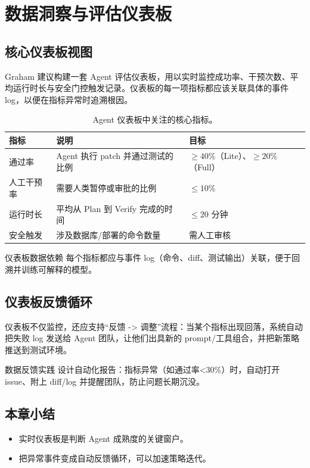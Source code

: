 \section{数据洞察与评估仪表板}
\subsection{核心仪表板视图}
Graham 建议构建一套 Agent 评估仪表板，用以实时监控成功率、干预次数、平均运行时长与安全门控触发记录。仪表板的每一项指标都应该关联具体的事件 log，以便在指标异常时追溯根因。

\begin{table}[H]
\centering
\begin{tabular}{p{} p{} p{}}
\toprule
指标 & 说明 & 目标 \\
\midrule
通过率 & Agent 执行 patch 并通过测试的比例 & \(\geq 40\%\)（Lite）、\(\geq 20\%\)（Full） \\
\midrule
人工干预率 & 需要人类暂停或审批的比例 & \(\leq 10\%\) \\
\midrule
运行时长 & 平均从 Plan 到 Verify 完成的时间 & \(\leq 20 \text{ 分钟}\) \\
\midrule
安全触发 & 涉及数据库/部署的命令数量 & 需人工审核 \\
\bottomrule
\end{tabular}
\caption{Agent 仪表板中关注的核心指标。}
\end{table}

\begin{knowledgebox}{仪表板数据依赖}
每个指标都应与事件 log（命令、diff、测试输出）关联，便于回溯并训练可解释的模型。
\end{knowledgebox}

\subsection{仪表板反馈循环}
仪表板不仅监控，还应支持“反馈 -> 调整”流程：当某个指标出现回落，系统自动把失败 log 发送给 Agent 团队，让他们出具新的 prompt/工具组合，并把新策略推送到测试环境。

\begin{importantbox}{数据反馈实践}
设计自动化报告：指标异常（如通过率<30\%）时，自动打开 issue、附上 diff/log 并提醒团队，防止问题长期沉没。
\end{importantbox}

\subsection{本章小结}
\begin{itemize}
    \item 实时仪表板是判断 Agent 成熟度的关键窗户。
    \item 把异常事件变成自动反馈循环，可以加速策略迭代。
\end{itemize}

